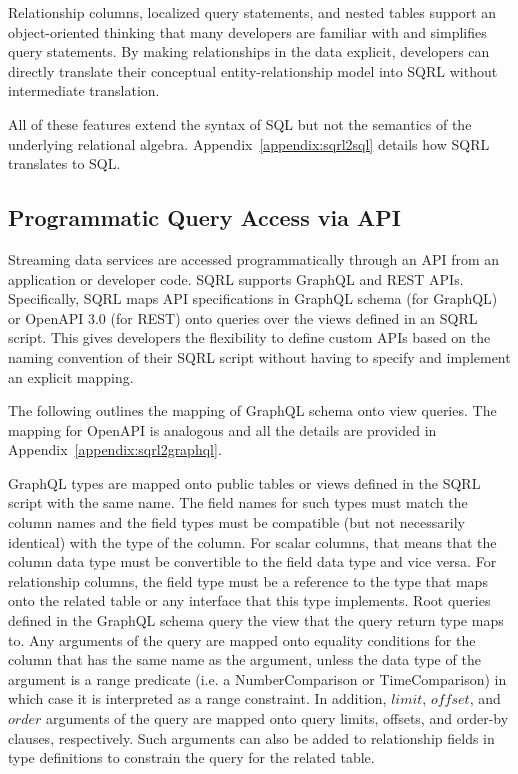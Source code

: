 \documentclass[	DIV=calc,%
							paper=letter,%
							fontsize=11pt,%
							twocolumn]{scrartcl}	 					%
\begin{document}
Relationship columns, localized query statements, and nested tables support an object-oriented thinking that many developers are familiar with and simplifies query statements. By making relationships in the data explicit, developers can directly translate their conceptual entity-relationship model into SQRL without intermediate translation.

All of these features extend the syntax of SQL but not the semantics of the underlying relational algebra. Appendix~\ref{appendix:sqrl2sql} details how SQRL translates to SQL.

\subsection{Programmatic Query Access via API}
\label{sec:sqrl_api}

Streaming data services are accessed programmatically through an API from an application or developer code. SQRL supports GraphQL and REST APIs. Specifically, SQRL maps API specifications in GraphQL schema (for GraphQL) or OpenAPI 3.0 (for REST) onto queries over the views defined in an SQRL script. This gives developers the flexibility to define custom APIs based on the naming convention of their SQRL script without having to specify and implement an explicit mapping.

The following outlines the mapping of GraphQL schema onto view queries. The mapping for OpenAPI is analogous and all the details are provided in Appendix~\ref{appendix:sqrl2graphql}.

GraphQL types are mapped onto public tables or views defined in the SQRL script with the same name. The field names for such types must match the column names and the field types must be compatible (but not necessarily identical) with the type of the column. For scalar columns, that means that the column data type must be convertible to the field data type and vice versa. For relationship columns, the field type must be a reference to the type that maps onto the related table or any interface that this type implements.
Root queries defined in the GraphQL schema query the view that the query return type maps to. Any arguments of the query are mapped onto equality conditions for the column that has the same name as the argument, unless the data type of the argument is a range predicate (i.e. a NumberComparison or TimeComparison) in which case it is interpreted as a range constraint. In addition, $limit$, $offset$, and $order$ arguments of the query are mapped onto query limits, offsets, and order-by clauses, respectively. Such arguments can also be added to relationship fields in type definitions to constrain the query for the related table.
\end{document}

